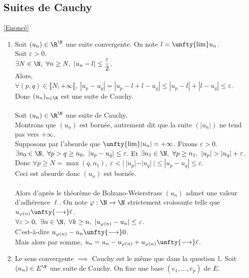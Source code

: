 \documentclass{book}
\begin{document}
	\subsection{Suites de Cauchy }
	\label{Suites de Cauchy corrigé}
	\textcolor{blue}{\hyperref[Suites de Cauchy]{[Enoncé]}}\\
	\begin{enumerate}[leftmargin=*]
		\item Soit $(u_n)\in \R^\N$ une suite convergente. On note $l=\unfty{\lim}u_n$.\\
		Soit $\varepsilon>0$.\\
		$\exists N\in \N,\ \forall n\geq N,\ |u_n-l|\leq \displaystyle\frac{\varepsilon}{2}$.\\
		Alors, $\forall (p,q)\in \llbracket N;+\infty\llbracket,\ |u_p-u_q|=|u_p-l+l-u_q|\leq |u_p-l|+|l-u_q|\leq \varepsilon$.\\
		Donc $(u_n)_{n\in \N}$ est une suite de Cauchy.\\\\
		Soit $(u_n)\in \R^\N$ une suite de Cauchy.\\
		Montrons que $(u_n)$ est bornée, autrement dit que la suite $(|u_n|)$ ne tend pas vers $+\infty$.\\
		Supposons par l'absurde que $\unfty{\lim}|u_n|=+\infty$. Fixons $\varepsilon>0$.\\
		$\exists n_0\in \N,\ \forall p>q\geq n_0,\ |u_p-u_q|\leq \varepsilon$. Et $\exists n_1\in \N,\ \forall p\geq n_1,\ |u_p|>|u_q|+\varepsilon$.\\
		Donc $\forall p\geq N=\max(q,n_1),\ \varepsilon<|\ |u_p|-|u_q|\ |\leq |u_p-u_q|\leq \varepsilon$.\\
		Ceci est absurde donc $(u_n)$ est bornée.\\\\
		Alors d'après le théorème de Bolzano-Weierstrass $(u_n)$ admet une valeur d'adhérence $\ell$. On note $\varphi:\N\to\N$ strictement croissante telle que $u_{\varphi(n)}\unfty{\longrightarrow}\ell$.\\
		$\forall \varepsilon>0,\ \exists n\in \N,\ \forall k\geq n,\ |u_{\varphi(n)}-u_n|\leq \varepsilon$.\\
		C'est-à-dire $u_{\varphi(n)}-u_n\unfty{\longrightarrow}0$.\\
		Mais alors par somme, $u_n=u_n-u_{\varphi(n)}+u_{\varphi(n)}\unfty{\longrightarrow}\ell$.
		\item Le sens convergente $\implies$ Cauchy est le même que dans la question 1. Soit $(u_n)\in E^\N$ une suite de Cauchy. On fixe une base $(e_1,\dots,e_p)$ de $E$.\\

\end{enumerate}
\end{document}

